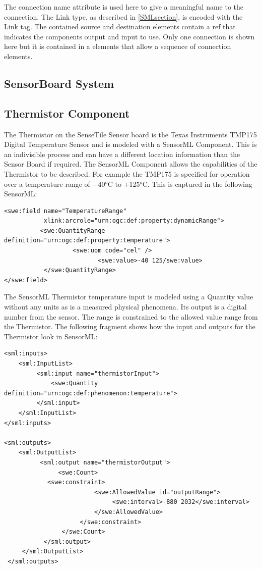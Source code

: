 \documentclass[]{final_report}
\begin{document}
The connection name attribute is used here to give a meaningful name to the connection. The Link type, as described in \ref{SMLsection}, is encoded with the Link tag. The contained source and destination elements contain a ref that indicates the components output and input to use. Only one connection is shown here but it is contained in a elements that allow a sequence of connection elements. 
  
\subsection{SensorBoard System}


\subsection{Thermistor Component}
The Thermistor on the SenseTile Sensor board is the Texas Instruments TMP175 Digital Temperature Sensor and is modeled with a SensorML Component. This is an indivisible process and can have a different location information than the Sensor Board if required. The SensorML Component allows the capabilities of the Thermistor to be described. For example the TMP175 is  specified for operation over a temperature range of −40°C to +125°C. This is captured in the following SensorML:

\begin{lstlisting}
<swe:field name="TemperatureRange" 
           xlink:arcrole="urn:ogc:def:property:dynamicRange">
          <swe:QuantityRange definition="urn:ogc:def:property:temperature">
                   <swe:uom code="cel" /> 
                          <swe:value>-40 125/swe:value> 
           </swe:QuantityRange>
</swe:field>
\end{lstlisting}

The SensorML Thermistor temperature input is modeled using a Quantity value without any units as is a measured physical phenomena. Its output is a digital number from the sensor. The range is constrained to the allowed value range from the Thermistor. The following fragment shows how the input and outputs for the Thermistor look in SensorML:

\begin{lstlisting}
<sml:inputs>
    <sml:InputList>
         <sml:input name="thermistorInput">
             <swe:Quantity definition="urn:ogc:def:phenomenon:temperature">
         </sml:input>
    </sml:InputList>
</sml:inputs>

<sml:outputs>
    <sml:OutputList>
          <sml:output name="thermistorOutput">
               <swe:Count>
	        <swe:constraint>
                         <swe:AllowedValue id="outputRange">
                              <swe:interval>-880 2032</swe:interval>
                         </swe:AllowedValue>
                     </swe:constraint>
                </swe:Count>
           </sml:output>
     </sml:OutputList>
 </sml:outputs>
\end{lstlisting}
\end{document}
